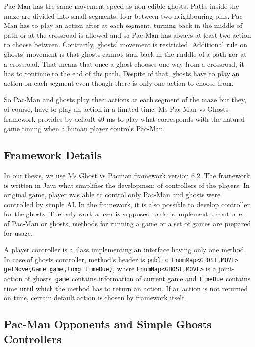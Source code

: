 Pac-Man has the same movement speed as non-edible ghosts. Paths inside the maze are divided
into small segments, four between two neighbouring pills. Pac-Man has to play an action after
at each segment, turning back in the middle of path or at the crossroad is allowed and so
Pac-Man has always at least two action to choose between. Contrarily, ghosts' movement is
restricted. Additional rule on ghosts' movement is that ghosts cannot turn back in the middle
of a path nor at a crossroad. That means that once a ghost chooses one way from a crossroad, it
has to continue to the end of the path. Despite of that, ghosts have to play an action on each
segment even though there is only one action to choose from.

So Pac-Man and ghosts play their actions at each segment of the maze but they, of course, have
to play an action in a limited time. Ms Pac-Man vs Ghosts framework provides by default 40 ms
to play what corresponds with the natural game timing when a human player controls Pac-Man.


\subsection{Framework Details}

In our thesis, we use Ms Ghost vs Pacman framework version 6.2. The framework is written in
Java what simplifies the development of controllers of the players. In original game, player
was able to control only Pac-Man and ghosts were controlled by simple AI. In the framework,
it is also possible to develop controller for the ghosts. The only work a user is supposed to 
do is
implement a controller of Pac-Man or ghosts, methods for running a game or a set of games are
prepared for usage. 

A player controller is a class implementing an interface having only one
method. In case of ghosts controller, method's header is \texttt{public EnumMap<GHOST,MOVE>
getMove(Game game,long timeDue)}, where \texttt{EnumMap<GHOST,MOVE>} is a joint-action of
ghosts, \texttt{game} contains information of current game and \texttt{timeDue} contains time
until which the method has to return an action.
If an action is not returned on time, certain
default action is chosen by framework itself.



\subsection{Pac-Man Opponents and Simple Ghosts Controllers}

